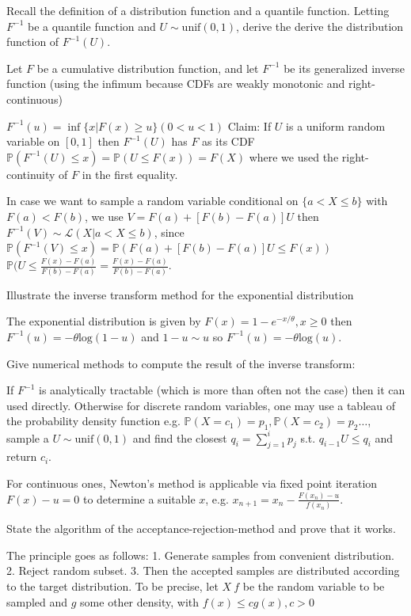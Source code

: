 Recall the definition of a distribution function and a quantile function. Letting
\( F^{-1} \) be a quantile function and \( U \sim \text{unif}(0, 1) \), derive the 
derive the distribution function of \( F^{-1}(U) \).

Let \( F \) be a cumulative distribution function, and let 
\( F^{-1} \) be its generalized inverse function (using the infimum because CDFs are weakly monotonic and right-continuous)

\( F^{-1}(u) = \inf \{x | F(x) \geq u\} (0<u<1)\)
Claim: If \( U \) is a uniform random variable on \( [0, 1] \) then \( F^{-1}(U) \) has \( F \) as its CDF
\( \mathbb{P}(F^{-1}(U) \leq x) = \mathbb{P}(U \leq F(x)) = F(X) \)
where we used the right-continuity of \( F \) in the first equality.

In case we want to sample a random variable conditional on \( \{a < X \leq b \}\) with \( F(a) < F(b) \),
we use \( V = F(a) + [F(b) - F(a)]U \) then \( F^{-1}(V) \sim \mathcal{L}(X|a < X \leq b)\), since
\( \mathbb{P}(F^{-1}(V) \leq x) = \mathbb{P}(F(a) + [F(b) - F(a)]U \leq F(x))\) 
\( \mathbb{P}(U \leq \frac{F(x) - F(a)}{F(b) - F(a)} = \frac{F(x) - F(a)}{F(b) - F(a)} \).

Illustrate the inverse transform method for the exponential distribution

The exponential distribution is given by \( F(x) = 1 - e^{-x/\theta}, x \geq 0 \)
then \( F^{-1}(u) = - \theta\text{log}(1 - u) \) and \( 1 - u \sim u \) so
\( F^{-1}(u) = - \theta\text{log}(u) \).


Give numerical methods to compute the result of the inverse transform:

If \( F^{-1} \) is analytically tractable (which is more than often not the case)
then it can used directly. 
Otherwise for discrete random variables, one may use a tableau of the 
probability density function e.g. \( \mathbb{P}(X = c_1) = p_{1}, \mathbb{P}(X = c_2) = p_{2} \dots \),
sample a \( U \sim \text{unif}(0, 1) \) and find the closest \( q_i = \sum_{j=1}^{i} p_j \) s.t. \( q_{i-1} U \leq q_i \) and return \( c_i \).

For continuous ones, Newton's method is applicable via fixed point iteration \( F(x) - u = 0 \) to determine a suitable \( x \), e.g. 
\( x_{n+1} = x_n - \frac{F(x_n) - u}{f(x_n)} \).

State the algorithm of the acceptance-rejection-method and prove that it works.

The principle goes as follows:
1. Generate samples from convenient distribution.
2. Reject random subset.
3. Then the accepted samples are distributed according to the target distribution.
To be precise, let \( X ~ f \) be the random variable to be sampled and \( g \) some other density, with \( f(x) \leq cg(x), c > 0 \)

